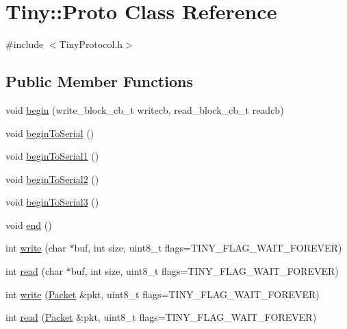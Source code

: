 \hypertarget{classTiny_1_1Proto}{}\section{Tiny\+:\+:Proto Class Reference}
\label{classTiny_1_1Proto}


{\ttfamily \#include $<$Tiny\+Protocol.\+h$>$}

\subsection*{Public Member Functions}
\begin{DoxyCompactItemize}
\item 
void \hyperlink{classTiny_1_1Proto_a6f5f4ebec42dc6e679c25e79284d7705}{begin} (write\+\_\+block\+\_\+cb\+\_\+t writecb, read\+\_\+block\+\_\+cb\+\_\+t readcb)
\item 
void \hyperlink{classTiny_1_1Proto_a1dcad822337b6155148b1da9222fdd82}{begin\+To\+Serial} ()
\item 
void \hyperlink{classTiny_1_1Proto_a707f3112e0ca3651d4b0f3df6c19dd8c}{begin\+To\+Serial1} ()
\item 
void \hyperlink{classTiny_1_1Proto_a6d06cd3b1530e4986ce42a9987c522c4}{begin\+To\+Serial2} ()
\item 
void \hyperlink{classTiny_1_1Proto_aedbc025e1534105134e4a2499d32207c}{begin\+To\+Serial3} ()
\item 
void \hyperlink{classTiny_1_1Proto_ae9f52fa1c4f18981672ad7af12633d4e}{end} ()
\item 
int \hyperlink{classTiny_1_1Proto_a46fbc8b8681431b9b0a9a4b953a8dc33}{write} (char $\ast$buf, int size, uint8\+\_\+t flags=T\+I\+N\+Y\+\_\+\+F\+L\+A\+G\+\_\+\+W\+A\+I\+T\+\_\+\+F\+O\+R\+E\+V\+E\+R)
\item 
int \hyperlink{classTiny_1_1Proto_acc00ac10509eaa11a83b0b88a2278b3e}{read} (char $\ast$buf, int size, uint8\+\_\+t flags=T\+I\+N\+Y\+\_\+\+F\+L\+A\+G\+\_\+\+W\+A\+I\+T\+\_\+\+F\+O\+R\+E\+V\+E\+R)
\item 
int \hyperlink{classTiny_1_1Proto_ade93766700805a81be6a3317d846b276}{write} (\hyperlink{classTiny_1_1Packet}{Packet} \&pkt, uint8\+\_\+t flags=T\+I\+N\+Y\+\_\+\+F\+L\+A\+G\+\_\+\+W\+A\+I\+T\+\_\+\+F\+O\+R\+E\+V\+E\+R)
\item 
int \hyperlink{classTiny_1_1Proto_aedef629f8b8968db7c8693bb45039651}{read} (\hyperlink{classTiny_1_1Packet}{Packet} \&pkt, uint8\+\_\+t flags=T\+I\+N\+Y\+\_\+\+F\+L\+A\+G\+\_\+\+W\+A\+I\+T\+\_\+\+F\+O\+R\+E\+V\+E\+R)

\end{DoxyCompactItemize}
